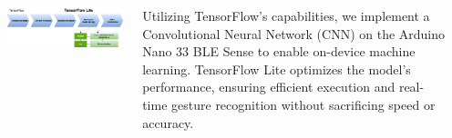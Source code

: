 \documentclass[25pt,a0paper, portrait]{tikzposter}
\begin{document}
\begin{columns}
{{\begin{tikzfigure}
				\includegraphics[height= 18 cm , width=43 cm]{images/Tensorflow}
				
			\end{tikzfigure}	
			
			Utilizing TensorFlow’s capabilities, we implement a Convolutional Neural Network (CNN) on the Arduino Nano 33 BLE Sense to enable on-device machine learning. TensorFlow Lite optimizes the model's performance, ensuring efficient execution and real-time gesture recognition without sacrificing speed or accuracy.
		}
		
		{
				\begin{tikzfigure}
					

\end{tikzfigure}}}
\end{columns}
\end{document}
